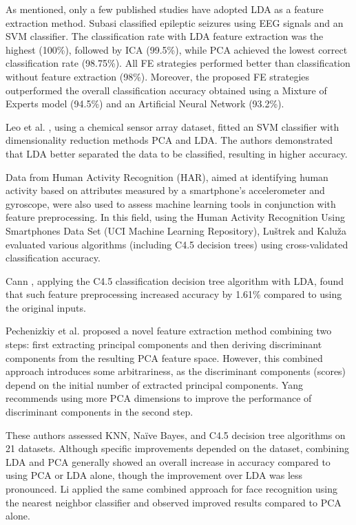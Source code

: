 \documentclass[11pt,a4paper]{article}
\begin{document}
As mentioned, only a few published studies have adopted LDA as a feature extraction method.  
Subasi \citep{subasi2010eeg} classified epileptic seizures using EEG signals and an SVM classifier. The classification rate with LDA feature extraction was the highest (100\%), followed by ICA (99.5\%), while PCA achieved the lowest correct classification rate (98.75\%).  
All FE strategies performed better than classification without feature extraction (98\%). Moreover, the proposed FE strategies outperformed the overall classification accuracy obtained using a Mixture of Experts model (94.5\%) and an Artificial Neural Network (93.2\%).

Leo et al. \citep{leo2014efficient}, using a chemical sensor array dataset, fitted an SVM classifier with dimensionality reduction methods PCA and LDA. The authors demonstrated that LDA better separated the data to be classified, resulting in higher accuracy.

Data from Human Activity Recognition (HAR), aimed at identifying human activity based on attributes measured by a smartphone's accelerometer and gyroscope, were also used to assess machine learning tools in conjunction with feature preprocessing.  
In this field, using the Human Activity Recognition Using Smartphones Data Set (UCI Machine Learning Repository), Luštrek and Kaluža \citep{luvstrek2009fall} evaluated various algorithms (including C4.5 decision trees) using cross-validated classification accuracy.

Cann \citep{cannfeature}, applying the C4.5 classification decision tree algorithm with LDA, found that such feature preprocessing increased accuracy by 1.61\% compared to using the original inputs.

Pechenizkiy et al. \citep{pechenizkiy2006combining} proposed a novel feature extraction method combining two steps: first extracting principal components and then deriving discriminant components from the resulting PCA feature space.  
However, this combined approach introduces some arbitrariness, as the discriminant components (scores) depend on the initial number of extracted principal components.  
Yang \citep{yang2003can} recommends using more PCA dimensions to improve the performance of discriminant components in the second step.

These authors assessed KNN, Naïve Bayes, and C4.5 decision tree algorithms on 21 datasets.  
Although specific improvements depended on the dataset, combining LDA and PCA generally showed an overall increase in accuracy compared to using PCA or LDA alone, though the improvement over LDA was less pronounced.  
Li \citep{li2009face} applied the same combined approach for face recognition using the nearest neighbor classifier and observed improved results compared to PCA alone.
\end{document}
